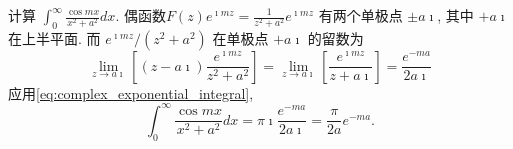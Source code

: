 \begin{examplebox}{计算 $\int_0^{\infty} \frac{\cos m x}{x^2+a^2} d x$.}
偶函数$F(z) e^{\imath m z}=\frac{1}{z^2+a^2} e^{\imath m z}$ 有两个单极点 $\pm a \imath$, 其中 $+a \imath$ 在上半平面. 而 $e^{\imath m z} /\left(z^2+a^2\right)$ 在单极点 $+a \imath$ 的留数为
    $$
    \lim _{z \rightarrow a \imath}\left[(z-a \imath) \frac{e^{\imath m z}}{z^2+a^2}\right]=\lim _{z \rightarrow a \imath}\left[\frac{e^{\imath m z}}{z+a \imath}\right]=\frac{e^{-m a}}{2 a \imath}
    $$
    应用\ref{eq:complex_exponential_integral},
    $$
    \int_0^{\infty} \frac{\cos m x}{x^2+a^2} d x=\pi \imath \frac{e^{-m a}}{2 a \imath}=\frac{\pi}{2 a} e^{-m a}.
    $$
\end{examplebox}